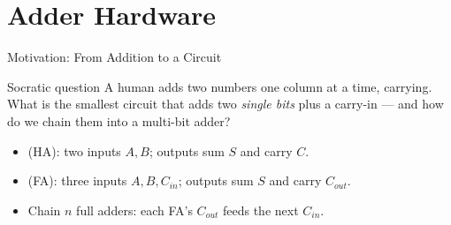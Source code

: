 \documentclass[aspectratio=169]{beamer}
\begin{document}

\section{Adder Hardware}

\begin{frame}{Motivation: From Addition to a Circuit}
  \begin{block}{Socratic question}
    A human adds two numbers one column at a time, carrying. What is the
    smallest circuit that adds two \emph{single bits} plus a carry-in --- and
    how do we chain them into a multi-bit adder?
  \end{block}
  \begin{itemize}
    \item {} (HA): two inputs $A, B$; outputs sum $S$ and
      carry $C$.
    \item {} (FA): three inputs $A, B, C_{in}$; outputs sum $S$
      and carry $C_{out}$.
    \item Chain $n$ full adders: each FA's $C_{out}$ feeds the next $C_{in}$.
  \end{itemize}
\end{frame}
\end{document}
